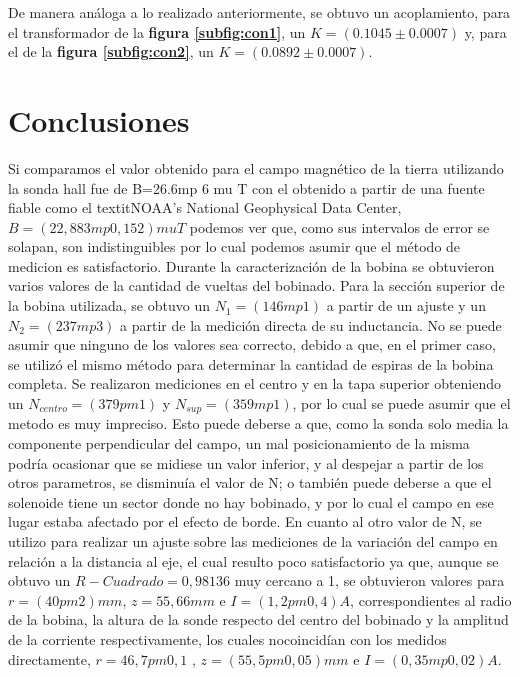 \documentclass[11pt,a4paper]{article}
\begin{document}
De manera análoga a lo realizado anteriormente, se obtuvo un acoplamiento, para el transformador de la \textbf{figura \ref{subfig:con1}}, un $K=(0.1045\pm 0.0007)$ y, para el de la \textbf{figura \ref{subfig:con2}}, un $K=(0.0892 \pm 0.0007)$.



\section{Conclusiones}
\label{sec:conclusiones}
Si comparamos el valor obtenido para el campo magnético de la tierra utilizando la sonda hall fue de B=26.6mp 6 mu T con el obtenido a partir de una fuente fiable como el textit{NOAA's National Geophysical Data Center}, $B = (22,883 mp 0,152)mu T$ podemos ver que, como sus intervalos de error se solapan, son indistinguibles por lo cual podemos asumir que el método de medicion es satisfactorio.
Durante la caracterización de la bobina se obtuvieron varios valores de la cantidad de vueltas del bobinado. Para la sección superior de la bobina utilizada, se obtuvo un $N_{1}= (146 mp 1)$ a partir de un ajuste y un $N_{2} = (237 mp 3)$ a partir de la medición directa de su inductancia. No se puede asumir que ninguno de los valores sea correcto, debido a que, en el primer caso,  se utilizó el mismo método para determinar la cantidad de espiras de la bobina completa. Se realizaron mediciones en el centro y en la tapa superior obteniendo un $N_{centro} = (379 pm 1)$ y $N_{sup} = (359 mp 1)$, por lo cual se puede asumir que el metodo es muy impreciso. Esto puede deberse a que, como la sonda solo media la componente perpendicular del campo, un mal posicionamiento de la misma podría ocasionar que se midiese un valor inferior, y al despejar a partir de los otros parametros, se disminuía el valor de N; o también puede deberse a que el solenoide tiene un sector donde no hay bobinado, y por lo cual el campo en ese lugar estaba afectado por el efecto de borde. En cuanto al otro valor de N, se utilizo para realizar un ajuste sobre las mediciones de la variación del campo en relación a la distancia al eje, el cual resulto poco satisfactorio ya que, aunque se obtuvo un $R-Cuadrado = 0,98136$ muy cercano a 1, se obtuvieron valores para $r= (40 pm 2)mm$, $z= 55,66 mm$ e $I= (1,2 pm 0,4)A$, correspondientes al radio de la bobina, la altura de la sonde respecto del centro del bobinado y la amplitud de la corriente respectivamente, los cuales nocoincidían con los medidos directamente, $r=46,7 pm 0,1$ , $z = (55,5 pm 0,05) mm$ e $I= (0,35 mp 0,02)A$.
\end{document}
